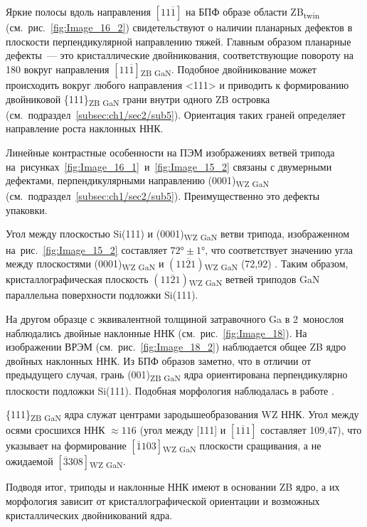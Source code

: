 Яркие полосы вдоль направления \([11\overline{1}]\) на БПФ образе области ZB\textsubscript{twin} (см.~рис.~\cref{fig:Image_16_2}) свидетельствуют о наличии планарных дефектов в плоскости перпендикулярной направлению тяжей. Главным образом планарные дефекты~--- это кристаллические двойникования, соответствующие повороту на 180{\textdegree} вокруг направления \([11\overline{1}]\)\textsubscript{ZB GaN}. Подобное двойникование может происходить вокруг любого направления <111> \cite{Suturin2017} и приводить к формированию двойниковой \{111\}\textsubscript{ZB GaN} грани внутри одного ZB островка (см.~подраздел~\cref{subsec:ch1/sec2/sub5}). Ориентация таких граней определяет направление роста наклонных ННК.

Линейные контрастные особенности на ПЭМ изображениях ветвей трипода на~рисунках~\cref{fig:Image_16_1}~и~\cref{fig:Image_15_2} связаны с двумерными дефектами, перпендикулярными направлению (0001)\textsubscript{WZ GaN} (см.~подраздел~\cref{subsec:ch1/sec2/sub5}). Преимущественно это дефекты упаковки.

Угол между плоскостью Si(111) и (0001)\textsubscript{WZ GaN} ветви трипода, изображенном на~рис.~\cref{fig:Image_15_2} составляет \(72\si{\degree} \pm 1\si{\degree}\), что соответствует значению угла между плоскостями (0001)\textsubscript{WZ GaN} и \((11\overline{2}1)\)\textsubscript{WZ GaN} (72,92\textdegree) \cite{Wang2016}. Таким образом, кристаллографическая плоскость \((11\overline{2}1)\)\textsubscript{WZ GaN} ветвей триподов GaN параллельна поверхности подложки Si(111).

На другом образце с эквивалентной толщиной затравочного Ga в 2~монослоя наблюдались двойные наклонные ННК (см.~рис.~\cref{fig:Image_18}). На изображении ВРЭМ (см.~рис.~\cref{fig:Image_18_2}) наблюдается общее ZB ядро двойных наклонных ННК. Из БПФ образов заметно, что в отличии от предыдущего случая, грань (001)\textsubscript{ZB GaN} ядра ориентирована перпендикулярно плоскости подложки Si(111). Подобная морфология наблюдалась в работе \cite{Wang2017}.

\{111\}\textsubscript{ZB GaN} ядра служат центрами зародышеобразования WZ ННК. Угол между осями сросшихся ННК \(\approx 116\){\textdegree} (угол между [111] и \([\overline{111}]\) составляет 109,47\textdegree), что указывает на формирование \([\overline{1}103]\)\textsubscript{WZ GaN} плоскости сращивания, а не ожидаемой \([\overline{3}308]\)\textsubscript{WZ GaN}.

Подводя итог, триподы и наклонные ННК имеют в основании ZB ядро, а их морфология зависит от кристаллографической ориентации и возможных кристаллических двойникований ядра.

